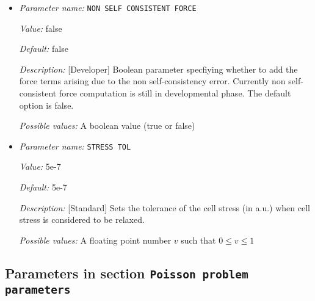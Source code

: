 \begin{itemize}
{\it Possible values:} Any string
\item {\it Parameter name:} {\tt NON SELF CONSISTENT FORCE}
\label{parameters:Geometry/Optimization/NON SELF CONSISTENT FORCE}
\label{parameters:Geometry/Optimization/NON_20SELF_20CONSISTENT_20FORCE}


{\it Value:} false


{\it Default:} false


{\it Description:} [Developer] Boolean parameter specfiying whether to add the force terms arising due to the non self-consistency error. Currently non self-consistent force computation is still in developmental phase. The default option is false.


{\it Possible values:} A boolean value (true or false)
\item {\it Parameter name:} {\tt STRESS TOL}
\label{parameters:Geometry/Optimization/STRESS TOL}
\label{parameters:Geometry/Optimization/STRESS_20TOL}


{\it Value:} 5e-7


{\it Default:} 5e-7


{\it Description:} [Standard] Sets the tolerance of the cell stress (in a.u.) when cell stress is considered to be relaxed.


{\it Possible values:} A floating point number $v$ such that $0 \leq v \leq 1$
\end{itemize}

\subsection{Parameters in section \tt Poisson problem parameters}
\label{parameters:Poisson_20problem_20parameters}

